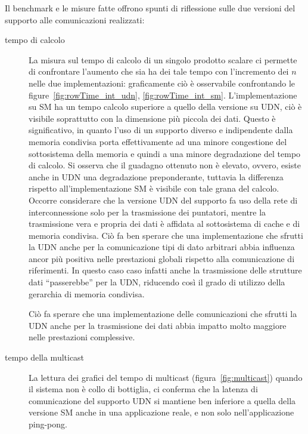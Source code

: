 Il benchmark e le misure fatte offrono spunti di riflessione sulle due versioni del supporto alle comunicazioni realizzati: 
\begin{description}
\item [tempo di calcolo] La misura sul tempo di calcolo di un singolo prodotto scalare ci permette di confrontare l'aumento che sia ha dei tale tempo con l'incremento dei $n$ nelle due implementazioni: graficamente ci\`o \`e osservabile confrontando le figure~\ref{fig:rowTime_int_udn}, \ref{fig:rowTime_int_sm}. L'implementazione su SM ha un tempo calcolo superiore a quello della versione su UDN, ci\`o \`e visibile soprattutto con la dimensione pi\`u piccola dei dati. Questo \`e significativo, in quanto l'uso di un supporto diverso e indipendente dalla memoria condivisa porta effettivamente ad una minore congestione del sottosistema della memoria e quindi a una minore degradazione del tempo di calcolo. Si osserva che il guadagno ottenuto non \`e elevato, ovvero, esiste anche in UDN una degradazione preponderante, tuttavia la differenza rispetto all'implementazione SM \`e visibile con tale grana del calcolo. Occorre considerare che la versione UDN del supporto fa uso della rete di interconnessione solo per la trasmissione dei puntatori, mentre la trasmissione vera e propria dei dati \`e affidata al sottosistema di cache e di memoria condivisa. Ci\`o fa ben sperare che una implementazione che sfrutti la UDN anche per la comunicazione tipi di dato arbitrari abbia influenza ancor pi\`u positiva nelle prestazioni globali rispetto alla comunicazione di riferimenti. In questo caso caso infatti anche la trasmissione delle strutture dati ``passerebbe'' per la UDN, riducendo cos\`i il grado di utilizzo della gerarchia di memoria condivisa.

Ci\`o fa sperare che una implementazione delle comunicazioni che sfrutti la UDN anche per la trasmissione dei dati abbia impatto molto maggiore nelle prestazioni complessive.
\item [tempo della multicast] La lettura dei grafici del tempo di multicast (figura~\ref{fig:multicast}) quando il sistema non \`e collo di bottiglia, ci conferma che la latenza di comunicazione del supporto UDN si mantiene ben inferiore a quella della versione SM anche in una applicazione reale, e non solo nell'applicazione ping-pong. 
\end{description}

